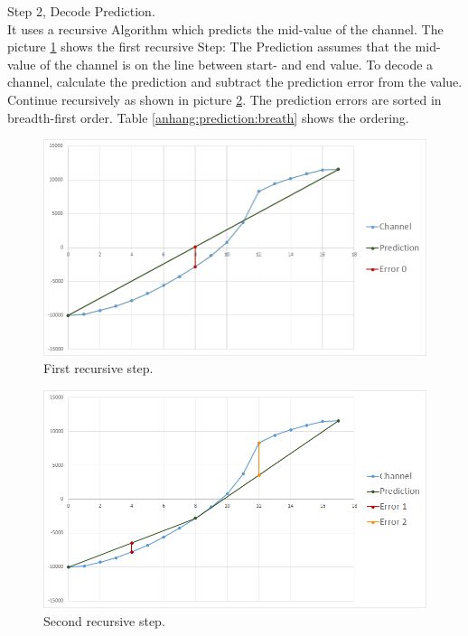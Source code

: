 Step 2, Decode Prediction.\\
It uses a recursive Algorithm which predicts the mid-value of the channel. The picture \ref{anhang:prediction:step1} shows the first recursive Step: The Prediction assumes that the mid-value of the channel is on the line between start- and end value. To decode a channel, calculate the prediction and subtract the prediction error from the value. Continue recursively as shown in picture \ref{anhang:prediction:step2}. The prediction errors are sorted in breadth-first order. Table \ref{anhang:prediction:breath} shows the ordering.

\begin{figure}[!htbp]
	\center
	\includegraphics[width=1\textwidth,keepaspectratio]{./pictures/anhang/prediction0.png}
	\caption{First recursive step.}
	\label{anhang:prediction:step1}
\end{figure}
\begin{figure}[!htbp]
	\center
	\includegraphics[width=1\textwidth,keepaspectratio]{./pictures/anhang/prediction1.png}
	\caption{Second recursive step.}
	\label{anhang:prediction:step2}
\end{figure}
